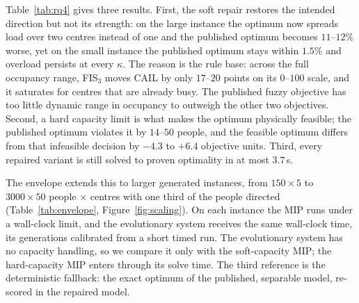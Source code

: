 \documentclass[systems,article,submit,moreauthors,pdftex]{Definitions/mdpi}
\begin{document}
Table~\ref{tab:rq4} gives three results. First, the soft repair restores the intended
direction but not its strength: on the large instance the optimum now spreads load over two
centres instead of one and the published optimum becomes $11$--$12\%$ worse, yet on the
small instance the published optimum stays within $1.5\%$ and overload persists at every
$\kappa$. The reason is the rule base: across the full occupancy range, FIS$_3$ moves CAIL
by only $17$--$20$ points on its $0$--$100$ scale, and it saturates for centres that are
already busy. The published fuzzy objective has too little dynamic range in occupancy to
outweigh the other two objectives. Second, a hard capacity limit is what makes the optimum
physically feasible; the published optimum violates it by $14$--$50$ people, and the feasible
optimum differs from that infeasible decision by $-4.3$ to $+6.4$ objective units. Third,
every repaired variant is still solved to proven optimality in at most $3.7$\,s.

The envelope extends this to larger generated instances, from $150\times5$ to $3000\times50$
people $\times$ centres with one third of the people directed (Table~\ref{tab:envelope},
Figure~\ref{fig:scaling}). On each instance the MIP runs under a wall-clock limit, and the
evolutionary system receives the same wall-clock time, its generations calibrated from a
short timed run. The evolutionary system has no capacity handling, so we compare it only
with the soft-capacity MIP; the hard-capacity MIP enters through its solve time. The third
reference is the deterministic fallback: the exact optimum of the published, separable
model, re-scored in the repaired model.
\end{document}
